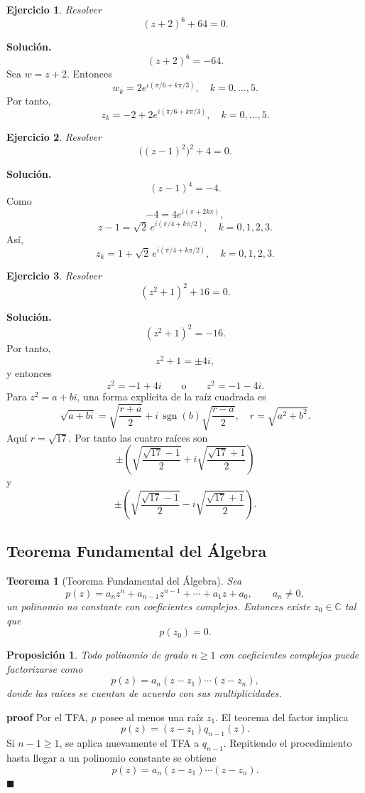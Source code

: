 \documentclass[12pt]{article}
\newtheorem{Prop}{Proposici\'on}
\newtheorem{ejercicio}{Ejercicio}[section]
\newtheorem{Teo}{Teorema}
\newcommand{\C}{\mathbb{C}}
\begin{document}
\begin{ejercicio}
Resolver
\[
(z+2)^6+64=0.
\]
\end{ejercicio}

\textbf{Solución.}
\[
(z+2)^6=-64.
\]
Sea $w=z+2$. Entonces
\[
w_k=2e^{i(\pi/6+k\pi/3)},\quad k=0,\ldots,5.
\]
Por tanto,
\[
\boxed{
z_k=-2+2e^{i(\pi/6+k\pi/3)},\quad k=0,\ldots,5.
}
\]

\begin{ejercicio}
Resolver
\[
\bigl((z-1)^2\bigr)^2+4=0.
\]
\end{ejercicio}

\textbf{Solución.}
\[
(z-1)^4=-4.
\]
Como
\[
-4=4e^{i(\pi+2k\pi)},
\]
\[
z-1=\sqrt2\,e^{i(\pi/4+k\pi/2)},\quad k=0,1,2,3.
\]
Así,
\[
\boxed{
z_k=1+\sqrt2\,e^{i(\pi/4+k\pi/2)},\quad k=0,1,2,3.
}
\]

\begin{ejercicio}
Resolver
\[
(z^2+1)^2+16=0.
\]
\end{ejercicio}

\textbf{Solución.}
\[
(z^2+1)^2=-16.
\]
Por tanto,
\[
z^2+1=\pm4i,
\]
y entonces
\[
z^2=-1+4i
\qquad\text{o}\qquad
z^2=-1-4i.
\]
Para $z^2=a+bi$, una forma explícita de la raíz cuadrada es
\[
\sqrt{a+bi}
=
\sqrt{\frac{r+a}{2}}
+i\,\operatorname{sgn}(b)
\sqrt{\frac{r-a}{2}},
\quad r=\sqrt{a^2+b^2}.
\]
Aquí $r=\sqrt{17}$. Por tanto las cuatro raíces son
\[
\boxed{
\pm\left(
\sqrt{\frac{\sqrt{17}-1}{2}}
+i\sqrt{\frac{\sqrt{17}+1}{2}}
\right)
}
\]
y
\[
\boxed{
\pm\left(
\sqrt{\frac{\sqrt{17}-1}{2}}
-i\sqrt{\frac{\sqrt{17}+1}{2}}
\right).
}
\]
\subsection*{Teorema Fundamental del Álgebra}
\begin{Teo}[Teorema Fundamental del Álgebra]
Sea
\[
p(z)=a_nz^n+a_{n-1}z^{n-1}+\cdots+a_1z+a_0,
\qquad a_n\neq0,
\]
un polinomio no constante con coeficientes complejos. Entonces existe
$z_0\in\C$ tal que
\[
p(z_0)=0.
\]
\end{Teo}

\begin{Prop}
Todo polinomio de grado $n\ge1$ con coeficientes complejos puede factorizarse
como
\[
\boxed{p(z)=a_n(z-z_1)\cdots(z-z_n),}
\]
donde las raíces se cuentan de acuerdo con sus multiplicidades.
\end{Prop}

\textbf{proof}
Por el TFA, $p$ posee al menos una raíz $z_1$. El teorema del factor implica
\[
p(z)=(z-z_1)q_{n-1}(z).
\]
Si $n-1\ge1$, se aplica nuevamente el TFA a $q_{n-1}$. Repitiendo el
procedimiento hasta llegar a un polinomio constante se obtiene
\[
p(z)=a_n(z-z_1)\cdots(z-z_n).
\]
 \hfill $\blacksquare$
\end{document}
